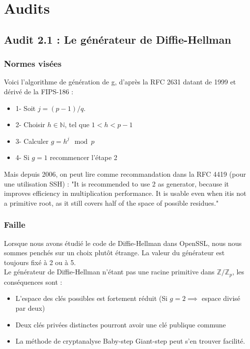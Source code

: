 \section{Audits}
	\subsection{Audit 2.1 : Le générateur de Diffie-Hellman}
		\subsubsection{Normes visées}

		Voici l'algorithme de génération de g, d'après la RFC 2631 \cite{rfc2631} datant de 1999 et dérivé de la FIPS-186 : 
		\begin{itemize}
		\item 1- Soit $j = (p - 1)/q$.
		\item 2- Choisir $h \in \mathbb{N}$, tel que $1 < h < p - 1$
		\item 3- Calculer $g = h^j \mod p$
		\item 4- Si $g = 1$ recommencer l'étape 2\\
		\end{itemize}
	
		Mais depuis 2006, on peut lire comme recommandation dans la RFC 4419 (pour une utilisation SSH) : "It is recommended to use 2 as generator, because it improves	efficiency in multiplication performance.  It is usable even when itis not a primitive root, as it still covers half of the space of possible residues."\\
	
		\subsubsection{Faille}
	
		Lorsque nous avons étudié le code de Diffie-Hellman dans OpenSSL, nous nous	sommes penchés sur un choix plutôt étrange. La valeur du générateur est toujours fixé à 2 ou à 5. \\
	
		Le générateur de Diffie-Hellman n'étant pas une racine primitive dans $\mathbb{Z}/\mathbb{Z}_p$, les conséquences sont :
		\begin{itemize}
		\item L'espace des clés possibles est fortement réduit (Si $g=2 \implies$ espace divisé par deux)
		\item Deux clés privées distinctes pourront avoir une clé publique commune
		\item La méthode de cryptanalyse Baby-step Giant-step peut s'en trouver 
		facilité.\\
		\end{itemize}
	
